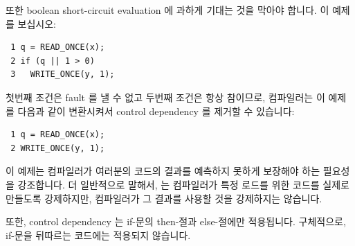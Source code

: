 또한 boolean short-circuit evaluation 에 과하게 기대는 것을 막아야 합니다.
이 예제를 보십시오:

\vspace{5pt}
\begin{minipage}[t]{\columnwidth}
\scriptsize
\begin{verbatim}
 1 q = READ_ONCE(x);
 2 if (q || 1 > 0)
 3   WRITE_ONCE(y, 1);
\end{verbatim}
\end{minipage}
\vspace{5pt}

첫번째 조건은 fault 를 낼 수 없고 두번째 조건은 항상 참이므로, 컴파일러는 이
예제를 다음과 같이 변환시켜서 control dependency 를 제거할 수 있습니다:

\vspace{5pt}
\begin{minipage}[t]{\columnwidth}
\scriptsize
\begin{verbatim}
 1 q = READ_ONCE(x);
 2 WRITE_ONCE(y, 1);
\end{verbatim}
\end{minipage}
\vspace{5pt}

이 예제는 컴파일러가 여러분의 코드의 결과를 예측하지 못하게 보장해야 하는
필요성을 강조합니다.
더 일반적으로 말해서,  는 컴파일러가 특정 로드를 위한 코드를
실제로 만들도록 강제하지만, 컴파일러가 그 결과를 사용할 것을 강제하지는
않습니다.

또한, control dependency 는 if-문의 then-절과 else-절에만 적용됩니다.
구체적으로, if-문을 뒤따르는 코드에는 적용되지 않습니다.

